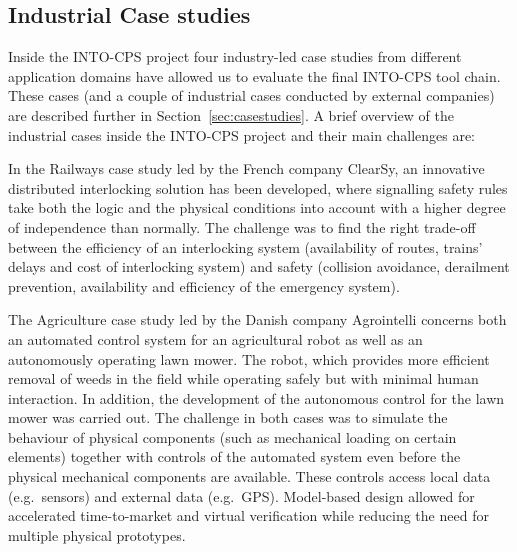 \subsection{Industrial Case studies}
Inside the INTO-CPS project four industry-led case studies from different application domains have allowed us to evaluate the final INTO-CPS tool chain. These cases (and a couple of industrial cases conducted by external companies) are described further in Section~\ref{sec:casestudies}. A brief overview of the industrial cases inside the INTO-CPS project and their main challenges are:

In the Railways case study led by the French company ClearSy, an innovative distributed interlocking solution has been developed, where signalling safety rules take both the logic and the physical conditions into account with a higher degree of independence than normally. The challenge was to find the right trade-off between the efficiency of an interlocking system (availability of routes, trains' delays and cost of interlocking system) and safety (collision avoidance, derailment prevention, availability and efficiency of the emergency system).

The Agriculture case study led by the Danish company Agrointelli concerns both an automated control system for an agricultural robot as well as an autonomously operating lawn mower. The robot, which provides more efficient removal of weeds in the field while operating safely but  with minimal human interaction. In addition, the development of the autonomous control for the lawn mower was carried out. The challenge in both cases was to simulate the behaviour of physical components (such as mechanical loading on certain elements) together with controls of the automated system even before the physical mechanical components are available. These controls access local data (e.g.\ sensors) and external data (e.g.\ GPS). Model-based design allowed for accelerated time-to-market and virtual verification while reducing the need for multiple physical prototypes.

